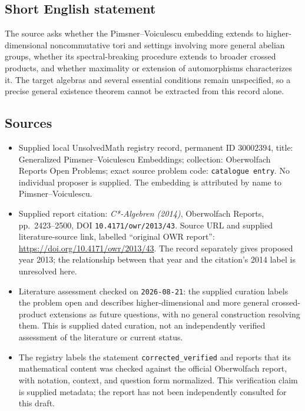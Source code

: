 \documentclass[11pt]{article}
\begin{document}
\subsection{Short English statement}
The source asks whether the Pimsner--Voiculescu embedding extends to higher-dimensional noncommutative tori and settings involving more general abelian groups, whether its spectral-breaking procedure extends to broader crossed products, and whether maximality or extension of automorphisms characterizes it. The target algebras and several essential conditions remain unspecified, so a precise general existence theorem cannot be extracted from this record alone.
\subsection{Sources}
\begin{itemize}
\item Supplied local UnsolvedMath registry record, permanent ID \(30002394\), title: Generalized Pimsner--Voiculescu Embeddings; collection: Oberwolfach Reports Open Problems; exact source problem code: \texttt{catalogue entry}. No individual proposer is supplied. The embedding is attributed by name to Pimsner--Voiculescu.
\item Supplied report citation: \emph{C*-Algebren (2014)}, Oberwolfach Reports, pp.\ 2423--2500, DOI \texttt{10.4171/owr/2013/43}. Source URL and supplied literature-source link, labelled ``original OWR report'': \url{https://doi.org/10.4171/owr/2013/43}. The record separately gives proposed year 2013; the relationship between that year and the citation's 2014 label is unresolved here.
\item Literature assessment checked on \texttt{2026-08-21}: the supplied curation labels the problem open and describes higher-dimensional and more general crossed-product extensions as future questions, with no general construction resolving them. This is supplied dated curation, not an independently verified assessment of the literature or current status.
\item The registry labels the statement \texttt{corrected\_verified} and reports that its mathematical content was checked against the official Oberwolfach report, with notation, context, and question form normalized. This verification claim is supplied metadata; the report has not been independently consulted for this draft.
\end{itemize}
\end{document}
